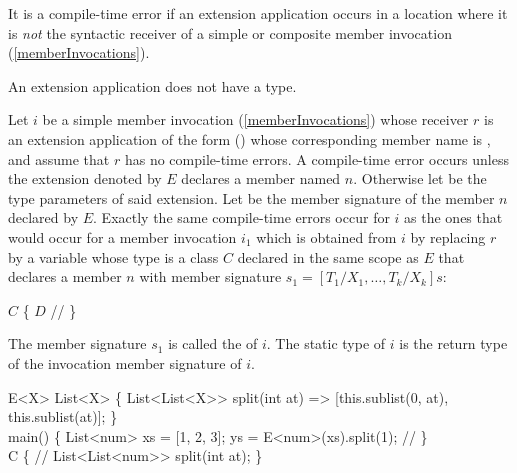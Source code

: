 \documentclass[makeidx]{article}
\begin{document}
\LMHash{}%
It is a compile-time error if an extension application occurs
in a location where it is \emph{not} the syntactic receiver of
a simple or composite member invocation
(\ref{memberInvocations}).


\LMHash{}%
An extension application does not have a type.


\LMHash{}%
%
Let $i$ be a simple member invocation
(\ref{memberInvocations})
whose receiver $r$ is an extension application of the form
%
()
whose corresponding member name is ,
and assume that $r$ has no compile-time errors.
A compile-time error occurs unless the extension denoted by $E$
declares a member named $n$.
Otherwise let  be
the type parameters of said extension.
Let  be the member signature of the member $n$ declared by $E$.
Exactly the same compile-time errors occur for $i$ as
the ones that would occur for a member invocation $i_1$
which is obtained from $i$ by replacing $r$ by
a variable whose type is
a class $C$ declared in the same scope as $E$
that declares a member $n$ with member signature
$s_1 = [T_1/X_1, \ldots, T_k/X_k]s$:

\begin{normativeDartCode}
\ABSTRACT{} \CLASS{} $C$ \{
  $D$ // 
\}
\end{normativeDartCode}

\LMHash{}%
The member signature $s_1$ is called the
of $i$.
The static type of $i$ is the return type of
the invocation member signature of $i$.

\begin{dartCode}
\EXTENSION{} E<X> \ON{} List<X> \{
  List<List<X>{}> split(int at) =>
      [this.sublist(0, at), this.sublist(at)];
\}
\\
\VOID{} main() \{
  List<num> xs = [1, 2, 3];
  \VAR{} ys = E<num>(xs).split(1); // \comment{(*)}
\}
\\
\ABSTRACT{} \CLASS{} C \{
  // 
  List<List<num>{}> split(int at);
\}
\end{dartCode}
\end{document}
